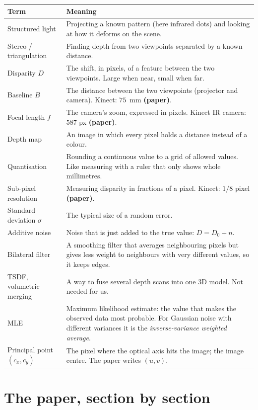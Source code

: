\documentclass[11pt,a4paper]{article}
\begin{document}
\begin{center}
\begin{tabularx}{\textwidth}{@{}l X@{}}
\toprule
Term & Meaning \\
\midrule
Structured light & Projecting a known pattern (here infrared dots) and looking at how it deforms on the scene. \\
Stereo / triangulation & Finding depth from two viewpoints separated by a known distance. \\
Disparity $D$ & The shift, in pixels, of a feature between the two viewpoints. Large when near, small when far. \\
Baseline $B$ & The distance between the two viewpoints (projector and camera). Kinect: $75$~mm \textbf{(paper)}. \\
Focal length $f$ & The camera's zoom, expressed in pixels. Kinect IR camera: $587$ px \textbf{(paper)}. \\
Depth map & An image in which every pixel holds a distance instead of a colour. \\
Quantisation & Rounding a continuous value to a grid of allowed values. Like measuring with a ruler that only shows whole millimetres. \\
Sub-pixel resolution & Measuring disparity in fractions of a pixel. Kinect: $1/8$ pixel \textbf{(paper)}. \\
Standard deviation $\sigma$ & The typical size of a random error. \\
Additive noise & Noise that is just added to the true value: $D = D_0 + n$. \\
Bilateral filter & A smoothing filter that averages neighbouring pixels but gives less weight to neighbours with very different values, so it keeps edges. \\
TSDF, volumetric merging & A way to fuse several depth scans into one 3D model. Not needed for us. \\
MLE & Maximum likelihood estimate: the value that makes the observed data most probable. For Gaussian noise with different variances it is the \emph{inverse-variance weighted average}. \\
Principal point $(c_x,c_y)$ & The pixel where the optical axis hits the image; the image centre. The paper writes $(u,v)$. \\
\bottomrule
\end{tabularx}
\end{center}

\section{The paper, section by section}
\end{document}
